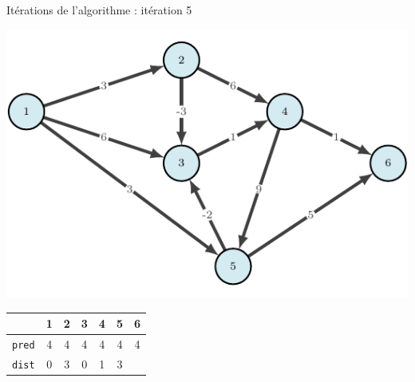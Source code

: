 \begin{frame}{Itérations de l'algorithme : itération 5}
    \begin{center}
        \includegraphics[height=.6\textheight]{fig/bellmann-0.pdf}      
    \begin{tabular}{c|cccccc}
      
        & 1    &2      &3      &4      &5      &6      \\
        \hline
        \texttt{pred} &4        &4      &4      &4      &4      &4      \\
        \texttt{dist} & 0       &3      &0      &1      &3      &\\                    \end{tabular}
\end{center}
\end{frame}

